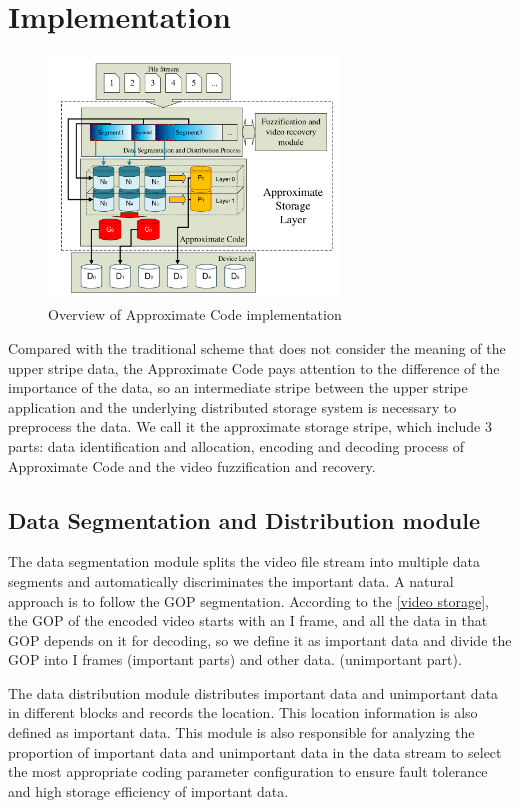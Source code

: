 \documentclass[sigconf]{acmart}
\begin{document}
\section{Implementation}\label{Implementation}
\begin{figure}[htb]
\centering
\includegraphics[height = 6.5cm]{photo/implementation-V2.pdf}
\caption{Overview of Approximate Code implementation}
\label{fig-implementation}
\end{figure}

Compared with the traditional scheme that does not consider the meaning of the upper stripe data, the Approximate Code pays attention to the difference of the importance of the data, so an intermediate stripe between the upper stripe application and the underlying distributed storage system is necessary to preprocess the data. We call it the approximate storage stripe, which include 3 parts: data identification and allocation, encoding and decoding process of Approximate Code and the video fuzzification and recovery.

\subsection{Data Segmentation and Distribution module}
The data segmentation module splits the video file stream into multiple data segments and automatically discriminates the important data. A natural approach is to follow the GOP segmentation. According to the \ref{video storage}, the GOP of the encoded video starts with an I frame, and all the data in that GOP depends on it for decoding, so we define it as important data and divide the GOP into I frames (important parts) and other data. (unimportant part).

The data distribution module distributes important data and unimportant data in different blocks and records the location. This location information is also defined as important data. This module is also responsible for analyzing the proportion of important data and unimportant data in the data stream to select the most appropriate coding parameter configuration to ensure fault tolerance and high storage efficiency of important data.
\end{document}

